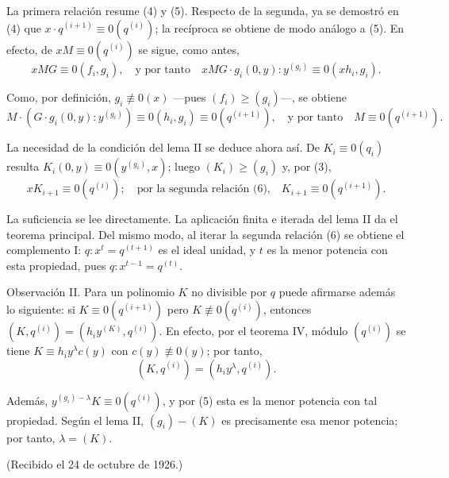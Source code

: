 La primera relación resume (4) y (5). Respecto de la segunda, ya se demostró en (4) que $x\cdot q^{(i+1)}\equiv0(q^{(i)})$; la recíproca se obtiene de modo análogo a (5). En efecto, de $xM\equiv0(q^{(i)})$ se sigue, como antes,
\[
xMG\equiv0(f_i,g_i),\quad\text{y por tanto}\quad
xMG\cdot g_i(0,y):y^{(g_i)}\equiv0(xh_i,g_i).
\]

Como, por definición, $g_i\not\equiv0(x)$ ---pues $(f_i)\geq(g_i)$---, se obtiene
\[
M\cdot(G\cdot g_i(0,y):y^{(g_i)})\equiv0(h_i,g_i)\equiv0(q^{(i+1)}),
\quad\text{y por tanto}\quad M\equiv0(q^{(i+1)}).
\]

La necesidad de la condición del lema II se deduce ahora así. De $K_i\equiv0(q_i)$ resulta $K_i(0,y)\equiv0(y^{(g_i)},x)$; luego $(K_i)\geq(g_i)$ y, por (3),
\[
xK_{i+1}\equiv0(q^{(i)});\quad\text{por la segunda relación (6),}\quad
K_{i+1}\equiv0(q^{(i+1)}).
\]

La suficiencia se lee directamente. La aplicación finita e iterada del lema II da el teorema principal. Del mismo modo, al iterar la segunda relación (6) se obtiene el complemento I: $q:x^t=q^{(t+1)}$ es el ideal unidad, y $t$ es la menor potencia con esta propiedad, pues $q:x^{t-1}=q^{(t)}$.

Observación II. Para un polinomio $K$ no divisible por $q$ puede afirmarse además lo siguiente: si $K\equiv0(q^{(i+1)})$ pero $K\not\equiv0(q^{(i)})$, entonces $(K,q^{(i)})=(h_iy^{(K)},q^{(i)})$. En efecto, por el teorema IV, módulo $(q^{(i)})$ se tiene $K\equiv h_iy^\lambda c(y)$ con $c(y)\not\equiv0(y)$; por tanto,
\[
(K,q^{(i)})=(h_iy^\lambda,q^{(i)}).
\]

Además, $y^{(g_i)-\lambda}K\equiv0(q^{(i)})$, y por (5) esta es la menor potencia con tal propiedad. Según el lema II, $(g_i)-(K)$ es precisamente esa menor potencia; por tanto, $\lambda=(K)$.

\begin{center}
(Recibido el 24 de octubre de 1926.)
\end{center}
